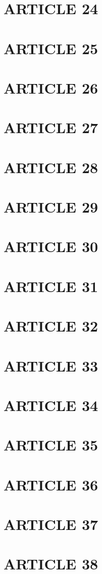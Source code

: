 \documentclass[a4paper, 11pt]{article}
\begin{document}
\section*{ARTICLE 24}
\section*{ARTICLE 25}
\section*{ARTICLE 26}
\section*{ARTICLE 27}
\section*{ARTICLE 28}
\section*{ARTICLE 29}
\section*{ARTICLE 30}
\section*{ARTICLE 31}
\section*{ARTICLE 32}
\section*{ARTICLE 33}
\section*{ARTICLE 34}
\section*{ARTICLE 35}
\section*{ARTICLE 36}
\section*{ARTICLE 37}
\section*{ARTICLE 38}
\end{document}

